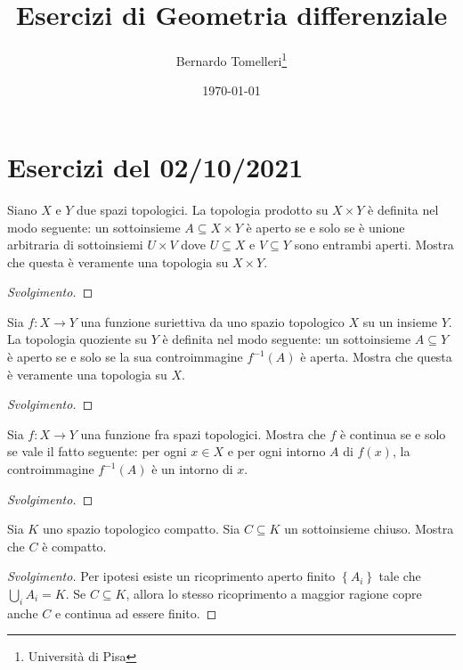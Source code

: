 \documentclass{article}[a4paper, 12pt, italian]
\title{Esercizi di Geometria differenziale}
\author{Bernardo Tomelleri\thanks{Università di Pisa}}
\date{\today}
\begin{document}
\maketitle

\section{Esercizi del 02/10/2021}
\begin{exercise}
Siano $X$ e $Y$ due spazi topologici. La topologia prodotto su $X \times Y$
è definita nel modo seguente: un sottoinsieme $A \subseteq X \times Y$ è
aperto se e solo se è unione arbitraria di sottoinsiemi $U \times V$ dove
$U \subseteq X$ e $V \subseteq Y$ sono entrambi aperti. Mostra che questa è
veramente una topologia su $X \times Y$.
\begin{proof}[Svolgimento]

\end{proof}
\end{exercise}

\begin{exercise}
Sia $f: X \to Y$ una funzione suriettiva da uno spazio topologico $X$ su
un insieme $Y.$ La topologia quoziente su $Y$ è definita nel modo seguente:
un sottoinsieme $A \subseteq Y$ è aperto se e solo se la sua controimmagine
$f^{-1}(A)$ è aperta. Mostra che questa è veramente una topologia su $X$.
\begin{proof}[Svolgimento]

\end{proof}
\end{exercise}

\begin{exercise}
Sia $f: X \to Y$ una funzione fra spazi topologici. Mostra che $f$ è
continua se e solo se vale il fatto seguente: per ogni $x \in X$ e per ogni
intorno $A$ di $f(x)$, la controimmagine $f^{-1}(A)$ è un intorno di $x$.
\begin{proof}[Svolgimento]

\end{proof}
\end{exercise}


\begin{exercise}
Sia $K$ uno spazio topologico compatto. Sia $C \subseteq K$ un sottoinsieme
chiuso. Mostra che $C$ è compatto.
\begin{proof}[Svolgimento]
Per ipotesi esiste un ricoprimento aperto finito $\left\{A_i\right\}$ tale
che $\bigcup_i A_i = K$. Se $C \subseteq K$, allora lo stesso ricoprimento
a maggior ragione copre anche $C$ e continua ad essere finito.
\end{proof}
\end{exercise}
\end{document}
